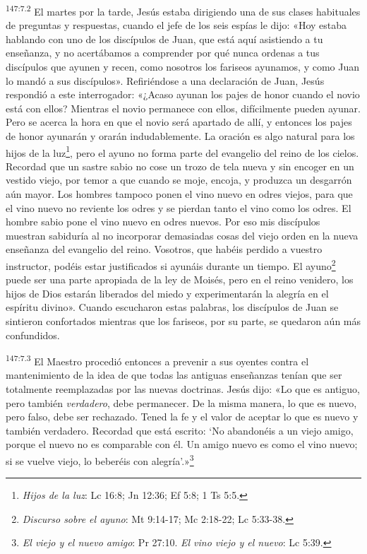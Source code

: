 \par 
\textsuperscript{147:7.2} El martes por la tarde, Jesús estaba dirigiendo una de sus clases habituales de preguntas y respuestas, cuando el jefe de los seis espías le dijo: «Hoy estaba hablando con uno de los discípulos de Juan, que está aquí asistiendo a tu enseñanza, y no acertábamos a comprender por qué nunca ordenas a tus discípulos que ayunen y recen, como nosotros los fariseos ayunamos, y como Juan lo mandó a sus discípulos». Refiriéndose a una declaración de Juan, Jesús respondió a este interrogador: «¿Acaso ayunan los pajes de honor cuando el novio está con ellos? Mientras el novio permanece con ellos, difícilmente pueden ayunar. Pero se acerca la hora en que el novio será apartado de allí, y entonces los pajes de honor ayunarán y orarán indudablemente. La oración es algo natural para los hijos de la luz\footnote{\textit{Hijos de la luz}: Lc 16:8; Jn 12:36; Ef 5:8; 1 Ts 5:5.}, pero el ayuno no forma parte del evangelio del reino de los cielos. Recordad que un sastre sabio no cose un trozo de tela nueva y sin encoger en un vestido viejo, por temor a que cuando se moje, encoja, y produzca un desgarrón aún mayor. Los hombres tampoco ponen el vino nuevo en odres viejos, para que el vino nuevo no reviente los odres y se pierdan tanto el vino como los odres. El hombre sabio pone el vino nuevo en odres nuevos. Por eso mis discípulos muestran sabiduría al no incorporar demasiadas cosas del viejo orden en la nueva enseñanza del evangelio del reino. Vosotros, que habéis perdido a vuestro instructor, podéis estar justificados si ayunáis durante un tiempo. El ayuno\footnote{\textit{Discurso sobre el ayuno}: Mt 9:14-17; Mc 2:18-22; Lc 5:33-38.} puede ser una parte apropiada de la ley de Moisés, pero en el reino venidero, los hijos de Dios estarán liberados del miedo y experimentarán la alegría en el espíritu divino». Cuando escucharon estas palabras, los discípulos de Juan se sintieron confortados mientras que los fariseos, por su parte, se quedaron aún más confundidos.

\par 
\textsuperscript{147:7.3} El Maestro procedió entonces a prevenir a sus oyentes contra el mantenimiento de la idea de que todas las antiguas enseñanzas tenían que ser totalmente reemplazadas por las nuevas doctrinas. Jesús dijo: «Lo que es antiguo, pero también \textit{verdadero}, debe permanecer. De la misma manera, lo que es nuevo, pero falso, debe ser rechazado. Tened la fe y el valor de aceptar lo que es nuevo y también verdadero. Recordad que está escrito: `No abandonéis a un viejo amigo, porque el nuevo no es comparable con él. Un amigo nuevo es como el vino nuevo; si se vuelve viejo, lo beberéis con alegría'.»\footnote{\textit{El viejo y el nuevo amigo}: Pr 27:10. \textit{El vino viejo y el nuevo}: Lc 5:39.}

